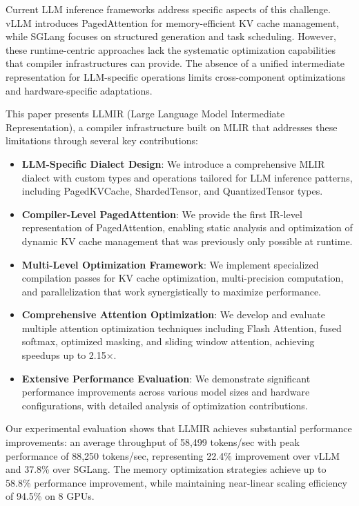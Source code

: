 \documentclass[conference]{IEEEtran}
\begin{document}
Current LLM inference frameworks address specific aspects of this challenge. vLLM \cite{b3} introduces PagedAttention for memory-efficient KV cache management, while SGLang \cite{b4} focuses on structured generation and task scheduling. However, these runtime-centric approaches lack the systematic optimization capabilities that compiler infrastructures can provide. The absence of a unified intermediate representation for LLM-specific operations limits cross-component optimizations and hardware-specific adaptations.

This paper presents LLMIR (Large Language Model Intermediate Representation), a compiler infrastructure built on MLIR \cite{b5} that addresses these limitations through several key contributions:

\begin{itemize}
    \item \textbf{LLM-Specific Dialect Design}: We introduce a comprehensive MLIR dialect with custom types and operations tailored for LLM inference patterns, including PagedKVCache, ShardedTensor, and QuantizedTensor types.
    
    \item \textbf{Compiler-Level PagedAttention}: We provide the first IR-level representation of PagedAttention, enabling static analysis and optimization of dynamic KV cache management that was previously only possible at runtime.
    
    \item \textbf{Multi-Level Optimization Framework}: We implement specialized compilation passes for KV cache optimization, multi-precision computation, and parallelization that work synergistically to maximize performance.
    
    \item \textbf{Comprehensive Attention Optimization}: We develop and evaluate multiple attention optimization techniques including Flash Attention, fused softmax, optimized masking, and sliding window attention, achieving speedups up to 2.15×.
    
    \item \textbf{Extensive Performance Evaluation}: We demonstrate significant performance improvements across various model sizes and hardware configurations, with detailed analysis of optimization contributions.
\end{itemize}

Our experimental evaluation shows that LLMIR achieves substantial performance improvements: an average throughput of 58,499 tokens/sec with peak performance of 88,250 tokens/sec, representing 22.4\% improvement over vLLM and 37.8\% over SGLang. The memory optimization strategies achieve up to 58.8\% performance improvement, while maintaining near-linear scaling efficiency of 94.5\% on 8 GPUs.
\end{document}
